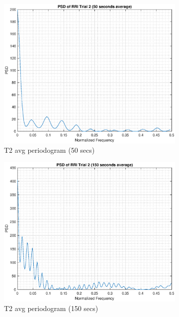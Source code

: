 \documentclass{article}
\begin{document}
\begin{figure}[h!]
\begin{subfigure}{0.32\textwidth}
\includegraphics[width = \textwidth]{rr_t2_50}
\caption{T2 avg periodogram (50 secs)}
\label{fig:rr_t2_50}
\end{subfigure}
\begin{subfigure}{0.32\textwidth}
\centering
\includegraphics[width = \textwidth]{rr_t2_150}
\caption{T2 avg periodogram (150 secs)}
\label{fig:rr_t2_150}
\end{subfigure}
\begin{subfigure}{0.32\textwidth}
\centering

\end{subfigure}
\end{figure}
\end{document}
